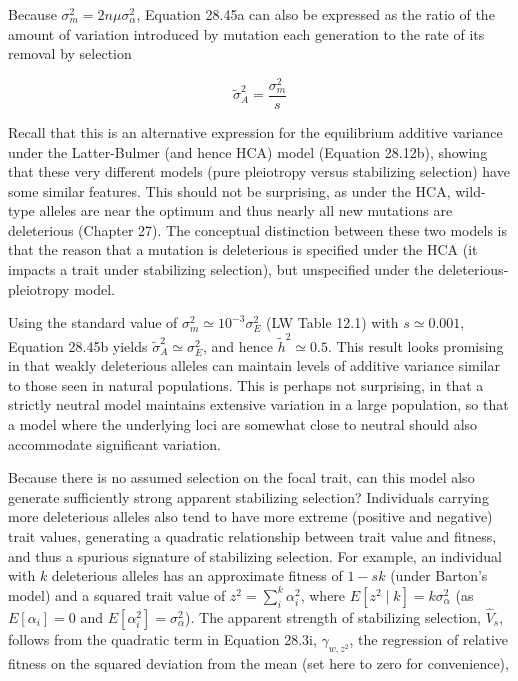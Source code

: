 \documentclass{article}
\begin{document}
Because  $ \sigma_m^2 = 2n\mu\sigma_\alpha^2 $, Equation 28.45a can also be expressed as the ratio of the amount of variation introduced by mutation each generation to the rate of its removal by selection

\begin{equation}
\widetilde{\sigma}_{A}^{2}=\frac{\sigma_{m}^{2}}{s}
\tag{28.45b}
\label{eq:28_45b}
\end{equation}

Recall that this is an alternative expression for the equilibrium additive variance under the Latter-Bulmer (and hence HCA) model (Equation 28.12b), showing that these very different models (pure pleiotropy versus stabilizing selection) have some similar features. This should not be surprising, as under the HCA, wild-type alleles are near the optimum and thus nearly all new mutations are deleterious (Chapter 27). The conceptual distinction between these two models is that the reason that a mutation is deleterious is specified under the HCA (it impacts a trait under stabilizing selection), but unspecified under the deleterious-pleiotropy model.

Using the standard value of  $ \sigma_m^2 \simeq 10^{-3} \sigma_E^2 $ (LW Table 12.1) with  $ s \simeq 0.001 $, Equation 28.45b yields  $ \widetilde{\sigma}_A^2 \simeq \sigma_E^2 $, and hence  $ \widetilde{h}^2 \simeq 0.5 $. This result looks promising in that weakly deleterious alleles can maintain levels of additive variance similar to those seen in natural populations. This is perhaps not surprising, in that a strictly neutral model maintains extensive variation in a large population, so that a model where the underlying loci are somewhat close to neutral should also accommodate significant variation.

Because there is no assumed selection on the focal trait, can this model also generate sufficiently strong apparent stabilizing selection? Individuals carrying more deleterious alleles also tend to have more extreme (positive and negative) trait values, generating a quadratic relationship between trait value and fitness, and thus a spurious signature of stabilizing selection. For example, an individual with $k$ deleterious alleles has an approximate fitness of $1 - sk$ (under Barton's model) and a squared trait value of $z^2 = \sum_i^k \alpha_i^2$, where $E[z^2 \mid k] = k\sigma_\alpha^2$ (as $E[\alpha_i] = 0$ and $E[\alpha_i^2] = \sigma_\alpha^2$). The apparent strength of stabilizing selection, $\widehat{V}_s$, follows from the quadratic term in Equation 28.3i, $\gamma_{w,z^2}$, the regression of relative fitness on the squared deviation from the mean (set here to zero for convenience),
\end{document}
